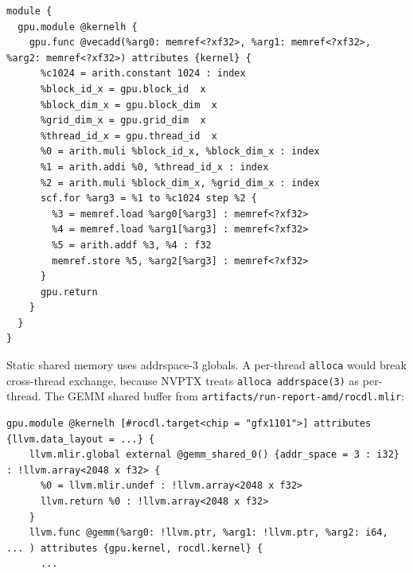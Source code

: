 \documentclass[10pt,twoside]{article}
\begin{document}
\begin{lstlisting}[caption={Verbatim \texttt{gpu.module} for vecadd (\texttt{gpu.mlir}).},
                   label={lst:gpumlir}]
module {
  gpu.module @kernelh {
    gpu.func @vecadd(%arg0: memref<?xf32>, %arg1: memref<?xf32>, %arg2: memref<?xf32>) attributes {kernel} {
      %c1024 = arith.constant 1024 : index
      %block_id_x = gpu.block_id  x
      %block_dim_x = gpu.block_dim  x
      %grid_dim_x = gpu.grid_dim  x
      %thread_id_x = gpu.thread_id  x
      %0 = arith.muli %block_id_x, %block_dim_x : index
      %1 = arith.addi %0, %thread_id_x : index
      %2 = arith.muli %block_dim_x, %grid_dim_x : index
      scf.for %arg3 = %1 to %c1024 step %2 {
        %3 = memref.load %arg0[%arg3] : memref<?xf32>
        %4 = memref.load %arg1[%arg3] : memref<?xf32>
        %5 = arith.addf %3, %4 : f32
        memref.store %5, %arg2[%arg3] : memref<?xf32>
      }
      gpu.return
    }
  }
}
\end{lstlisting}

Static shared memory uses addrspace-3 globals. A per-thread \texttt{alloca} would break
cross-thread exchange, because NVPTX treats \texttt{alloca addrspace(3)} as per-thread. The
GEMM shared buffer from \texttt{artifacts/run-report-amd/rocdl.mlir}:

\begin{lstlisting}[caption={Static-LDS lowering in the ROCDL module (\texttt{rocdl.mlir}).},
                   label={lst:rocdl}]
  gpu.module @kernelh [#rocdl.target<chip = "gfx1101">] attributes {llvm.data_layout = ...} {
    llvm.mlir.global external @gemm_shared_0() {addr_space = 3 : i32} : !llvm.array<2048 x f32> {
      %0 = llvm.mlir.undef : !llvm.array<2048 x f32>
      llvm.return %0 : !llvm.array<2048 x f32>
    }
    llvm.func @gemm(%arg0: !llvm.ptr, %arg1: !llvm.ptr, %arg2: i64, ... ) attributes {gpu.kernel, rocdl.kernel} {
      ...
\end{lstlisting}
\end{document}
